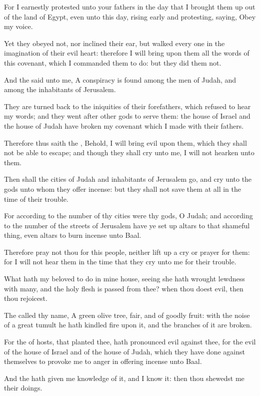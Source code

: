 \verse For I earnestly protested unto your fathers in the day that I brought them up out of the land of Egypt, even unto this day, rising early and protesting, saying, Obey my voice.

\verse Yet they obeyed not, nor inclined their ear, but walked every one in the imagination of their evil heart: therefore I will bring upon them all the words of this covenant, which I commanded them to do: but they did them not.

\verse And the \LORD said unto me, A conspiracy is found among the men of Judah, and among the inhabitants of Jerusalem.

\verse They are turned back to the iniquities of their forefathers, which refused to hear my words; and they went after other gods to serve them: the house of Israel and the house of Judah have broken my covenant which I made with their fathers.

\verse Therefore thus saith the \LORD, Behold, I will bring evil upon them, which they shall not be able to escape; and though they shall cry unto me, I will not hearken unto them.

\verse Then shall the cities of Judah and inhabitants of Jerusalem go, and cry unto the gods unto whom they offer incense: but they shall not save them at all in the time of their trouble.

\verse For according to the number of thy cities were thy gods, O Judah; and according to the number of the streets of Jerusalem have ye set up altars to that shameful thing, even altars to burn incense unto Baal.

\verse Therefore pray not thou for this people, neither lift up a cry or prayer for them: for I will not hear them in the time that they cry unto me for their trouble.

\verse What hath my beloved to do in mine house, seeing she hath wrought lewdness with many, and the holy flesh is passed from thee?  when thou doest evil, then thou rejoicest.

\verse The \LORD called thy name, A green olive tree, fair, and of goodly fruit: with the noise of a great tumult he hath kindled fire upon it, and the branches of it are broken.

\verse For the \LORD of hosts, that planted thee, hath pronounced evil against thee, for the evil of the house of Israel and of the house of Judah, which they have done against themselves to provoke me to anger in offering incense unto Baal.

\verse And the \LORD hath given me knowledge of it, and I know it: then thou shewedst me their doings.

